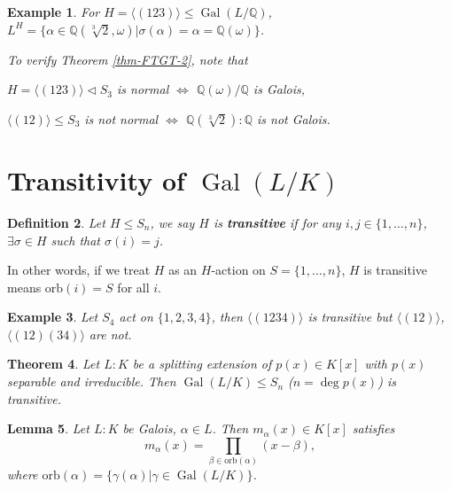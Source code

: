 \documentclass[11pt]{book}
\newtheorem{theorem}{Theorem}[section]
\newtheorem{definition}[theorem]{Definition}
\newtheorem{example}[theorem]{Example}
\newtheorem{lemma}[theorem]{Lemma}
\begin{document}
\begin{example}
    For $H=\langle(123)\rangle\leq \operatorname{Gal}(L /\mathbb{Q})$, $L^{H}=\{\alpha\in \mathbb{Q}(\sqrt[3]{2},\omega)|\sigma(\alpha)=\alpha=\mathbb{Q}(\omega)\}$. 

    \medskip
    To verify Theorem \ref{thm-FTGT-2}, note that 
    \begin{center}
        $H=\langle(123)\rangle\lhd S_{3}$ is normal $\iff$ $\mathbb{Q}(\omega) /\mathbb{Q}$ is Galois,
    \end{center} 
    \begin{center}
    $\langle(12)\rangle\leq S_{3}$ is not normal $\iff$ $\mathbb{Q}(\sqrt[3]{2}) :\mathbb{Q}$ is not Galois.     
    \end{center}
\end{example}

\section{Transitivity of $\operatorname{Gal}(L/K)$}

\begin{definition}
    Let $H\leq S_{n}$, we say $H$ is {\bf transitive} if for any $i,j\in \{1,\dots,n\}$, $\exists \sigma\in H$ such that $\sigma(i)=j$. 
\end{definition}

In other words, if we treat $H$ as an $H$-action on $S=\{1,\dots, n\}$, $H$ is transitive means $\mathrm{orb}(i)=S$ for all $i$. 

\begin{example}
    Let $S_{4}$ act on $\{1,2,3,4\}$, then $\langle(1234)\rangle$ is transitive but $\langle(12)\rangle$, $\langle(12)(34)\rangle$ are not. 
\end{example}

\begin{theorem}\label{thm-transitivityGaloisGroup}
    Let $L :K$ be a splitting extension of $p(x)\in K[x]$ with $p(x)$ separable and irreducible. Then $\operatorname{Gal}(L /K)\leq S_{n}$ ($n=\deg p(x)$) is transitive. 
\end{theorem}

\begin{lemma}\label{lem-orbitMinimalPoly}
    Let $L :K$ be Galois, $\alpha\in L$. Then $m_{\alpha}(x)\in K[x]$ satisfies 
    $$m_{\alpha}(x)=\prod_{\beta\in \mathrm{orb}(\alpha)}(x-\beta),$$ where $\mathrm{orb}(\alpha)=\{\gamma(\alpha)|\gamma\in \operatorname{Gal}(L /K)\}$. 
\end{lemma}
\end{document}
